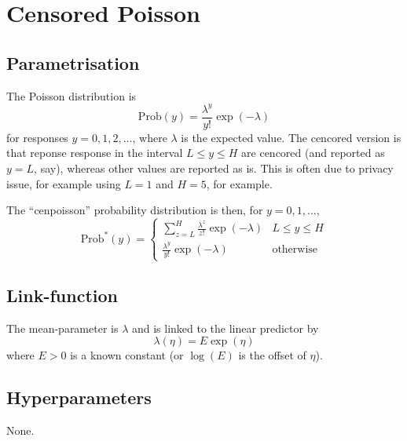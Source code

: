 \documentclass[a4paper,11pt]{article}
\begin{document}
\section*{Censored Poisson}

\subsection*{Parametrisation}

The Poisson distribution is
\begin{displaymath}
    \text{Prob}(y) = \frac{\lambda^{y}}{y!}\exp(-\lambda)
\end{displaymath}
for responses $y=0, 1, 2, \ldots$, where $\lambda$ is the expected
value. The cencored version is that reponse response in the interval
$L \le y \le H$ are cencored (and reported as $y=L$, say), whereas
other values are reported as is. This is often due to privacy issue,
for example using $L=1$ and $H=5$, for example. 

The ``cenpoisson'' probability distribution is then, for 
$y=0, 1, \ldots, $
\begin{displaymath}
    \text{Prob}^{*}(y) =
    \begin{cases}
      \sum_{z=L}^{H}
      \frac{\lambda^{z}}{z!}\exp(-\lambda) & L
                                             \leq
                                             y
                                             \leq
                                             H \\
      \frac{\lambda^{y}}{y!}\exp(-\lambda) & \text{otherwise}
    \end{cases}
\end{displaymath}

\subsection*{Link-function}

The mean-parameter is $\lambda$ and is linked to the linear predictor
by
\begin{displaymath}
    \lambda(\eta) = E \exp(\eta)
\end{displaymath}
where $E>0$ is a known constant (or $\log(E)$ is the offset of $\eta$).

\subsection*{Hyperparameters}

None.
\end{document}
